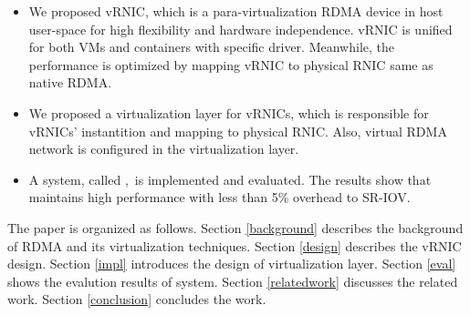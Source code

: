 \begin{itemize}
	\item We proposed vRNIC, which is a para-virtualization RDMA device in host user-space for high flexibility and hardware independence. vRNIC is unified for both VMs and containers with specific driver. Meanwhile, the performance is optimized by mapping vRNIC to physical RNIC same as native RDMA.
	
	\item We proposed a virtualization layer for vRNICs, which is responsible for vRNICs' instantition and mapping to physical RNIC. Also, virtual RDMA network is configured in the virtualization layer.
	
	\item A system, called \sys,~is implemented and evaluated. The results show that \sys maintains high performance with less than 5\% overhead to SR-IOV.
\end{itemize}

The paper is organized as follows. Section \ref{background} describes the background of RDMA and its virtualization techniques. Section \ref{design} describes the vRNIC design. Section \ref{impl} introduces the design of virtualization layer. Section \ref{eval} shows the evalution results of \sys system. Section \ref{relatedwork} discusses the related work. Section \ref{conclusion} concludes the work.